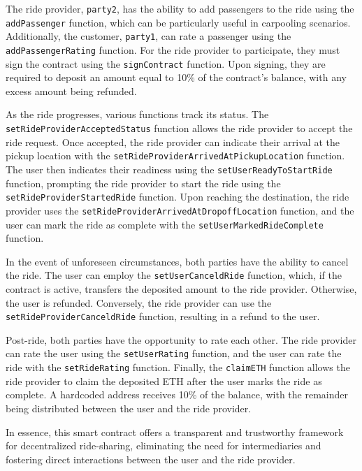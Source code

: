 The ride provider, \texttt{party2}, has the ability to add passengers to the ride using the \texttt{addPassenger} function, which can be particularly useful in carpooling scenarios. Additionally, the customer, \texttt{party1}, can rate a passenger using the \texttt{addPassengerRating} function. For the ride provider to participate, they must sign the contract using the \texttt{signContract} function. Upon signing, they are required to deposit an amount equal to 10\% of the contract's balance, with any excess amount being refunded.

As the ride progresses, various functions track its status. The \texttt{setRideProviderAcceptedStatus} function allows the ride provider to accept the ride request. Once accepted, the ride provider can indicate their arrival at the pickup location with the \texttt{setRideProviderArrivedAtPickupLocation} function. The user then indicates their readiness using the \texttt{setUserReadyToStartRide} function, prompting the ride provider to start the ride using the \texttt{setRideProviderStartedRide} function. Upon reaching the destination, the ride provider uses the \texttt{setRideProviderArrivedAtDropoffLocation} function, and the user can mark the ride as complete with the \texttt{setUserMarkedRideComplete} function.

In the event of unforeseen circumstances, both parties have the ability to cancel the ride. The user can employ the \texttt{setUserCanceldRide} function, which, if the contract is active, transfers the deposited amount to the ride provider. Otherwise, the user is refunded. Conversely, the ride provider can use the \texttt{setRideProviderCanceldRide} function, resulting in a refund to the user.

Post-ride, both parties have the opportunity to rate each other. The ride provider can rate the user using the \texttt{setUserRating} function, and the user can rate the ride with the \texttt{setRideRating} function. Finally, the \texttt{claimETH} function allows the ride provider to claim the deposited ETH after the user marks the ride as complete. A hardcoded address receives 10\% of the balance, with the remainder being distributed between the user and the ride provider.

In essence, this smart contract offers a transparent and trustworthy framework for decentralized ride-sharing, eliminating the need for intermediaries and fostering direct interactions between the user and the ride provider.

\lstset{
  basicstyle=\ttfamily,
  breaklines=true,
  numbers=left,
  firstnumber=5
}

